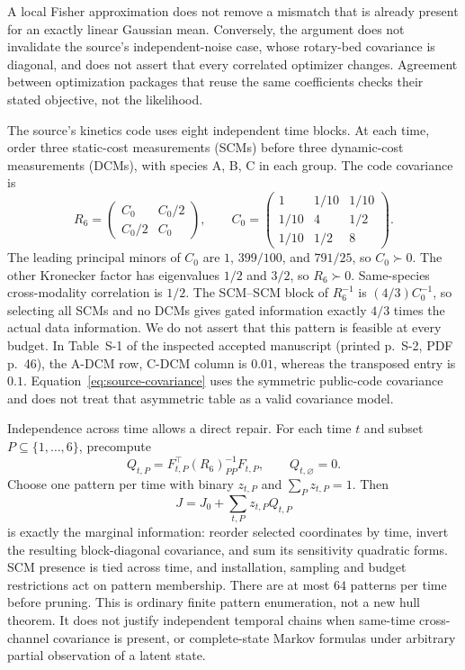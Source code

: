 A local Fisher approximation does not remove a mismatch that is already
present for an exactly linear Gaussian mean. Conversely, the argument does
not invalidate the source's independent-noise case, whose rotary-bed
covariance is diagonal, and does not assert that every correlated optimizer
changes. Agreement between optimization packages that reuse the same
coefficients checks their stated objective, not the likelihood.

The source's kinetics code uses eight independent time blocks. At each time,
order three static-cost measurements (SCMs) before three dynamic-cost
measurements (DCMs), with species A, B, C in each group. The code covariance is
\begin{equation}
 R_6=\begin{pmatrix}C_0&C_0/2\\C_0/2&C_0\end{pmatrix},\qquad
 C_0=\begin{pmatrix}1&1/10&1/10\\1/10&4&1/2\\1/10&1/2&8\end{pmatrix}.
 \label{eq:source-covariance}
\end{equation}
The leading principal minors of $C_0$ are $1$, $399/100$, and $791/25$,
so $C_0\succ0$. The other Kronecker factor has eigenvalues $1/2$ and $3/2$,
so $R_6\succ0$. Same-species cross-modality correlation is $1/2$.
The SCM--SCM block of $R_6^{-1}$ is $(4/3)C_0^{-1}$, so selecting all SCMs
and no DCMs gives gated information exactly $4/3$ times the actual data
information. We do not assert that this pattern is feasible at every
budget. In Table~S-1 of the inspected accepted manuscript (printed p.~S-2,
PDF p.~46), the A-DCM row, C-DCM column is $0.01$, whereas the transposed
entry is $0.1$. Equation~\eqref{eq:source-covariance} uses the symmetric
public-code covariance and does not treat that asymmetric table as a valid covariance model.

Independence across time allows a direct repair. For each time $t$ and subset
$P\subseteq\{1,\ldots,6\}$, precompute
\begin{equation}
 Q_{t,P}=F_{t,P}^\top(R_6)_{PP}^{-1}F_{t,P},\qquad
 Q_{t,\varnothing}=0.
 \label{eq:independent-pattern}
\end{equation}
Choose one pattern per time with binary $z_{t,P}$ and
$\sum_P z_{t,P}=1$. Then
\begin{equation}
 J=J_0+\sum_{t,P}z_{t,P}Q_{t,P}
 \label{eq:pattern-sum}
\end{equation}
is exactly the marginal information: reorder selected coordinates by time,
invert the resulting block-diagonal covariance, and sum its sensitivity
quadratic forms. SCM presence is tied across time, and installation,
sampling and budget restrictions act on pattern membership. There are at
most $64$ patterns per time before pruning. This is ordinary finite pattern
enumeration, not a new hull theorem. It does not justify independent temporal
chains when same-time cross-channel covariance is present, or complete-state
Markov formulas under arbitrary partial observation of a latent state.

